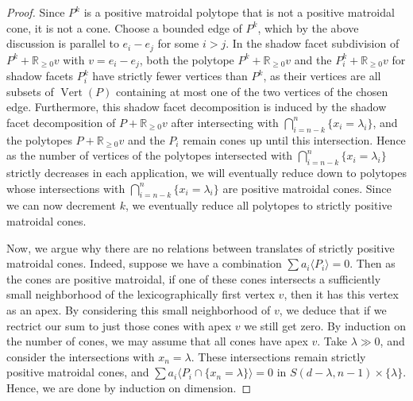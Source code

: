 \documentclass[12pt]{amsart}
\newcommand{\mb}{\mathbb}
\newcommand{\Vt}{{\operatorname{Vert}}}
\theoremstyle{plain}
\theoremstyle{definition}
\theoremstyle{remark}
\begin{document}
\begin{proof}
Since $P^k$ is a positive matroidal polytope that is not a positive matroidal cone, it is not a cone. Choose a bounded edge of $P^k$, which by the above discussion is parallel to $e_i-e_j$ for some $i>j$. In the shadow facet subdivision of $P^k + \mb{R}_{\ge 0}v$ with $v=e_i-e_j$, both the polytope $P^k+\mb{R}_{\ge 0}v$ and the $P^k_i+\mb{R}_{\ge 0}v$ for shadow facets $P^k_i$ have strictly fewer vertices than $P^k$, as their vertices are all subsets of $\Vt(P)$ containing at most one of the two vertices of the chosen edge. Furthermore, this shadow facet decomposition is induced by the shadow facet decomposition of $P+ \mb{R}_{\ge 0}v$ after intersecting with $\bigcap_{i=n-k}^n\{x_i=\lambda_i\}$, and the polytopes $P+\mb{R}_{\ge 0}v$ and the $P_i$ remain cones up until this intersection. Hence as the number of vertices of the polytopes intersected with $\bigcap_{i=n-k}^n\{x_i=\lambda_i\}$ strictly decreases in each application, we will eventually reduce down to polytopes whose intersections with $\bigcap_{i=n-k}^n\{x_i=\lambda_i\}$ are positive matroidal cones. Since we can now decrement $k$, we eventually reduce all polytopes to strictly positive matroidal cones.

Now, we argue why there are no relations between translates of strictly positive matroidal cones. Indeed, suppose we have a combination $\sum a_i \langle P_i \rangle=0$. Then as the cones are positive matroidal, if one of these cones intersects a sufficiently small neighborhood of the lexicographically first vertex $v$, then it has this vertex as an apex. By considering this small neighborhood of $v$, we deduce that if we rectrict our sum to just those cones with apex $v$ we still get zero. By induction on the number of cones, we may assume that all cones have apex $v$. Take $\lambda \gg 0$, and consider the intersections with $x_n=\lambda$. These intersections remain strictly positive matroidal cones, and $\sum a_i\langle P_i \cap \{x_n=\lambda\}\rangle=0$ in $S(d-\lambda,n-1)\times \{\lambda\}$. Hence, we are done by induction on dimension.
\end{proof}
\end{document}
